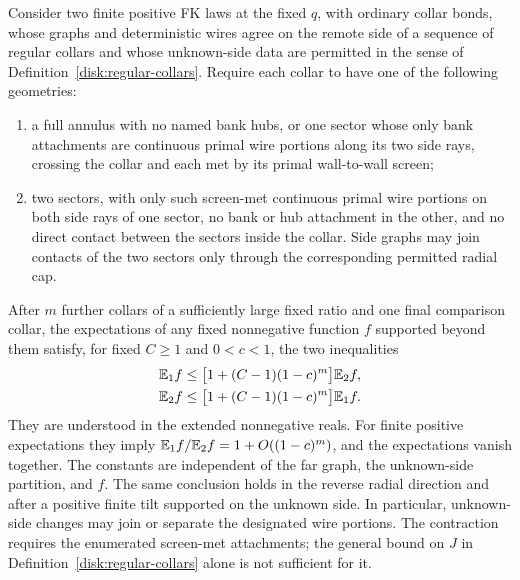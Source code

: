 \begin{proposition}
\label{prop:relative-collars}
Consider two finite positive FK laws at the fixed $q$, with ordinary
collar bonds, whose graphs and deterministic wires agree on the remote
side of a sequence of regular collars and whose unknown-side data are permitted in the sense of
Definition~\ref{disk:regular-collars}. Require each collar to have
one of the following geometries:
\begin{enumerate}[label=(\roman*)]
\item a full annulus with no named bank hubs, or one sector whose only
bank attachments are continuous primal wire portions along its two
side rays, crossing the collar and each met by its primal
wall-to-wall screen;
\item two sectors, with only such screen-met continuous primal wire
portions on both side rays of one sector, no bank or hub attachment in
the other, and no direct contact between the sectors inside the collar.
Side graphs may join contacts of the two sectors only through the
corresponding permitted radial cap.
\end{enumerate}
After $m$ further collars of a sufficiently large fixed ratio and
one final comparison collar, the expectations of any fixed
nonnegative function $f$ supported beyond them satisfy, for fixed
$C\ge1$ and $0<c<1$, the two inequalities
\begin{equation}\label{disk:relative-density}
 \begin{split}
 \mathbb E_1 f&\le\bigl[1+(C-1)(1-c)^m\bigr]\mathbb E_2 f,\\
 \mathbb E_2 f&\le\bigl[1+(C-1)(1-c)^m\bigr]\mathbb E_1 f.
 \end{split}
\end{equation}
They are understood in the extended nonnegative reals. For finite
positive expectations they imply
$\mathbb E_1 f/\mathbb E_2 f=1+O((1-c)^m)$, and the expectations vanish together.
The constants are independent of the far graph, the unknown-side
partition, and $f$. The same conclusion holds in the reverse radial
direction and after a positive finite tilt supported on the unknown
side. In particular, unknown-side changes may join or separate the
designated wire portions. The contraction requires the enumerated
screen-met attachments; the general bound on $J$ in
Definition~\ref{disk:regular-collars} alone is not sufficient for it.
\end{proposition}

